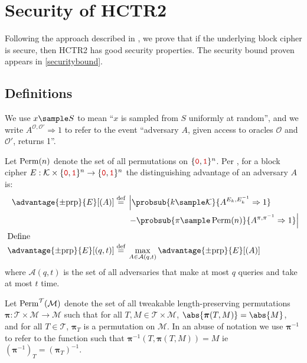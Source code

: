 \documentclass[hctr2.tex]{subfiles}
\begin{document}
\section{Security of HCTR2}\label{security}
Following the approach described in \cite{concrete},
we prove that if the underlying block cipher is secure,
then HCTR2 has good security properties.
The security bound proven appears in \autoref{securitybound}.
\subsection{Definitions}\label{definitions}
We use \(x \sample S\) to mean ``\(x\) is sampled from \(S\)
uniformly at random'', and we write
\(A^{\mathcal{O}, \mathcal{O}'}\Rightarrow 1\) to refer
to the event ``adversary \(A\),
given access to oracles \(\mathcal{O}\) and \(\mathcal{O}'\),
returns 1''.

Let $\operatorname{Perm}(n)$ denote the set of all permutations on \(\bin^n\).
Per \cite{concrete}, for a block cipher 
\(E: \mathcal{K} \times \bin^n \rightarrow \bin^n\)
the distinguishing advantage of an adversary \(A\) is:
%
\begin{align*}
    \advantage{\pm \mathrm{prp}}{E}[(A)] \defeq
    {}&\left\lvert\probsub{k \sample \mathcal{K}}{A^{E_k,E_k^{-1}}\Rightarrow 1}\right.
    \\
    {}&\left. - \probsub{\pi \sample \Perm(n)}{A^{\pi,\pi^{-1}}\Rightarrow 1}\right\rvert
    \\
    \intertext{Define}
    \advantage{\pm \mathrm{prp}}{E}[(q, t)] \defeq
    {}&\max_{A \in \mathcal{A}(q, t)} \advantage{\pm \mathrm{prp}}{E}[(A)]
\end{align*}
where $\mathcal{A}(q, t)$
is the set of all adversaries that make at most $q$ queries and take at most $t$ time.

Let $\operatorname{Perm}^\mathcal{T}(\mathcal{M})$
denote the set of all
tweakable length-preserving permutations
$\bm{\pi} : \mathcal{T} \times \mathcal{M} \rightarrow \mathcal{M}$
such that for all $T, M \in \mathcal{T} \times \mathcal{M}$,
$\abs{\bm{\pi}(T, M)} = \abs{M}$, and
for all $T \in \mathcal{T}$, $\bm{\pi}_{T}$ is a permutation on \(\mathcal{M}\).
In an abuse of notation
we use $\bm{\pi}^{-1}$ to refer to the function
such that $\bm{\pi}^{-1}(T, \bm{\pi}(T, M)) = M$ ie $(\bm{\pi}^{-1})_T = (\bm{\pi}_T)^{-1}$.
\end{document}
